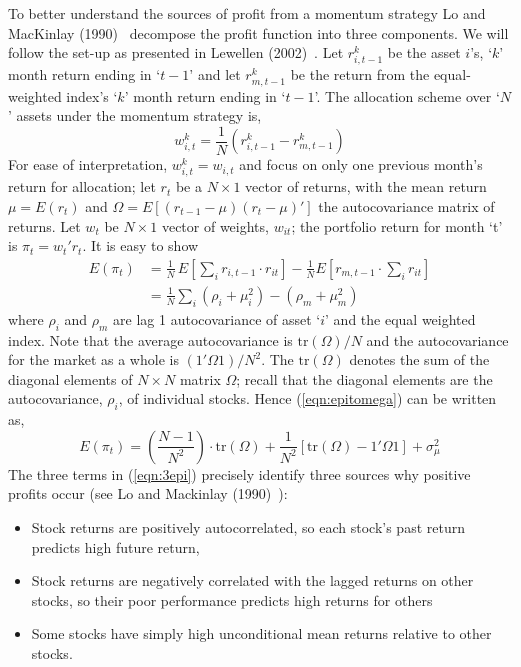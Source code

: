 To better understand the sources of profit from a momentum strategy Lo and MacKinlay (1990)~\cite{lo1990} decompose the profit function into three components. We will follow the set-up as presented in Lewellen (2002)~\cite{lew2002}. Let $r_{i,t-1}^k$ be the asset $i$'s, `$k$' month return ending in `$t-1$' and let $r_{m,t-1}^k$ be the return from the equal-weighted index's `$k$' month return ending in `$t-1$'. The allocation scheme over `$N$' assets under the momentum strategy is,
	\begin{equation}\label{eqn:witkrdiff}
	w_{i,t}^k= \frac{1}{N} (r_{i,t-1}^k - r_{m,t-1}^k)
	\end{equation}
For ease of interpretation, $w_{i,t}^k = w_{i,t}$ and focus on only one previous month's return for allocation; let $r_t$ be a $N \times 1$ vector of returns, with the mean return $\mu = E(r_t)$ and $\Omega = E[(r_{t-1} - \mu)(r_t - \mu)']$ the autocovariance matrix of returns. Let $w_t$ be $N \times 1$ vector of weights, $w_{it}$; the portfolio return for month `t' is $\pi_t = w_t'r_t$. It is easy to show
	\begin{equation}\label{eqn:epitomega}
	\begin{split}
	E(\pi_t)&= \frac{1}{N}\, E\left[\sum_i r_{i,t-1} \cdot r_{it} \right] - \frac{1}{N} E\left[r_{m,t-1} \cdot \sum_i r_{it} \right] \\
	&= \frac{1}{N}\sum_i (\rho_i + \mu_i^2) - (\rho_m + \mu_m^2)
	\end{split}
	\end{equation}
where $\rho_i$ and $\rho_m$ are lag 1 autocovariance of asset `$i$' and the equal weighted index. Note that the average autocovariance is $\text{tr}(\Omega)/N$ and the autocovariance for the market as a whole is $(1' \Omega 1)/N^2$. The $\text{tr}(\Omega)$ denotes the sum of the diagonal elements of $N \times N$ matrix $\Omega$; recall that the diagonal elements are the autocovariance, $\rho_i$, of individual stocks. Hence (\ref{eqn:epitomega}) can be written as,
	\begin{equation}\label{eqn:3epi}
	E(\pi_t) = \left(\frac{N-1}{N^2}\right)\cdot \text{tr}(\Omega) + \frac{1}{N^2} [\text{tr}(\Omega) - 1' \Omega 1] + \sigma_{\mu}^2
	\end{equation}
The three terms in (\ref{eqn:3epi}) precisely identify three sources why positive profits occur (see Lo and Mackinlay (1990)~\cite{lo1990}):
\begin{itemize}
\item Stock returns are positively autocorrelated, so each stock's past return predicts high future return,

\item Stock returns are negatively correlated with the lagged returns on other stocks, so their poor performance predicts high returns for others

\item Some stocks have simply high unconditional mean returns relative to other stocks.
\end{itemize}


